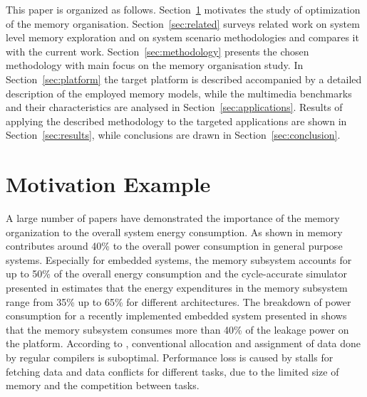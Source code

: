 \documentclass[a4paper,conference]{IEEEtran}
\begin{document}

This paper is organized as follows. Section~\ref{sec:motivation} motivates the study of optimization of the memory organisation. Section~\ref{sec:related} surveys related work on system level memory exploration and on system scenario methodologies and compares it with the current work. Section~\ref{sec:methodology} presents the chosen methodology with main focus on the memory organisation study. In Section~\ref{sec:platform} the target platform is described accompanied by a detailed description of the employed memory models, while the multimedia benchmarks and their characteristics are analysed in Section~\ref{sec:applications}. Results of applying the described methodology to the targeted applications are shown in Section~\ref{sec:results}, while conclusions are drawn in Section~\ref{sec:conclusion}. 

\section{Motivation Example}
\label{sec:motivation}

A large number of papers have demonstrated the importance of the memory organization to the overall system energy consumption. As shown in \cite{Gonzalez1996} memory contributes around 40\% to the overall power consumption in general purpose systems. Especially for embedded systems, the memory subsystem accounts for up to 50\% of the overall energy consumption \cite{Che09} and the cycle-accurate simulator presented in \cite{Ben99} estimates that the energy expenditures in the memory subsystem range from 35\% up to 65\% for different architectures. The breakdown of power consumption for a recently implemented embedded system presented in \cite{Hul11} shows that the memory subsystem consumes more than 40\% of the leakage power on the platform. According to \cite{tcm}, conventional allocation and assignment of data done by regular compilers is suboptimal. Performance loss is caused by stalls for fetching data and data conflicts for different tasks, due to the limited size of memory and the competition between tasks. 
\end{document}
